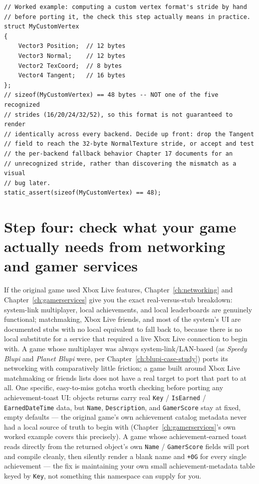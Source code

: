 \begin{lstlisting}
// Worked example: computing a custom vertex format's stride by hand
// before porting it, the check this step actually means in practice.
struct MyCustomVertex
{
    Vector3 Position;  // 12 bytes
    Vector3 Normal;    // 12 bytes
    Vector2 TexCoord;  // 8 bytes
    Vector4 Tangent;   // 16 bytes
};
// sizeof(MyCustomVertex) == 48 bytes -- NOT one of the five recognized
// strides (16/20/24/32/52), so this format is not guaranteed to render
// identically across every backend. Decide up front: drop the Tangent
// field to reach the 32-byte NormalTexture stride, or accept and test
// the per-backend fallback behavior Chapter 17 documents for an
// unrecognized stride, rather than discovering the mismatch as a visual
// bug later.
static_assert(sizeof(MyCustomVertex) == 48);
\end{lstlisting}

\section[Step four: networking and gamer services needs]{Step four: check what your game actually needs from networking and gamer services}

If the original game used Xbox Live features, Chapter~\ref{ch:networking} and
Chapter~\ref{ch:gamerservices} give you the exact real-versus-stub breakdown: system-link
multiplayer, local achievements, and local leaderboards are genuinely functional; matchmaking,
Xbox Live friends, and most of the  system's UI are documented stubs with no
local equivalent to fall back to, because there is no local substitute for a service that
required a live Xbox Live connection to begin with. A game whose multiplayer was always
system-link/LAN-based (as \emph{Speedy Blupi} and \emph{Planet Blupi} were, per
Chapter~\ref{ch:blupi-case-study}) ports its networking with comparatively little friction;
a game built around Xbox Live matchmaking or friends lists does not have a real target to
port that part to at all. One specific, easy-to-miss gotcha worth checking before porting any
achievement-toast UI:  objects 
returns carry real \texttt{Key} / \texttt{IsEarned} / \texttt{EarnedDateTime} data, but
\texttt{Name}, \texttt{Description}, and \texttt{GamerScore} stay at fixed, empty defaults ---
the original game's own achievement catalog metadata never had a local source of truth to begin
with (Chapter~\ref{ch:gamerservices}'s own worked example covers this precisely). A game whose
achievement-earned toast reads directly from the returned  object's own
\texttt{Name} / \texttt{GamerScore} fields will port and compile cleanly, then silently render a
blank name and \texttt{+0G} for every single achievement --- the fix is maintaining your own
small achievement-metadata table keyed by \texttt{Key}, not something this namespace can supply
for you.

